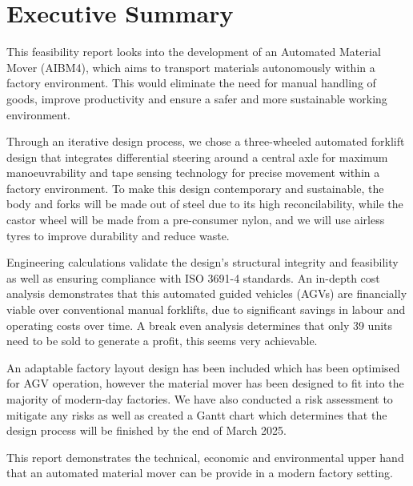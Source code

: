 \documentclass[12pt]{article}
\begin{document}
\tableofcontents

\newpage



\section{Executive Summary}
This feasibility report looks into the development of an Automated Material Mover (AIBM4), which aims to transport materials autonomously within a factory environment. This would eliminate the need for manual handling of goods, improve productivity and ensure a safer and more sustainable working environment. 
\par Through an iterative design process, we chose a three-wheeled automated forklift design that integrates differential steering around a central axle for maximum manoeuvrability and tape sensing technology for precise movement within a factory environment. To make this design contemporary and sustainable, the body and forks will be made out of steel due to its high reconcilability, while the castor wheel will be made from a pre-consumer nylon, and we will use airless tyres to improve durability and reduce waste.
\par Engineering calculations validate the design's structural integrity and feasibility as well as ensuring compliance with ISO 3691-4  standards. An in-depth cost analysis demonstrates that this automated guided vehicles (AGVs) are financially viable over conventional manual forklifts, due to significant savings in labour and operating costs over time. A break even analysis determines that only 39 units need to be sold to generate a profit, this seems very achievable.
\par An adaptable factory layout design has been included which has been optimised for AGV operation, however the material mover has been designed to fit into the majority of modern-day factories. We have also conducted a risk assessment to mitigate any risks as well as created a Gantt chart which determines that the design process will be finished by the end of March 2025.
\par This report demonstrates the technical, economic and environmental upper hand that an automated material mover can be provide in a modern factory setting.
\end{document}
